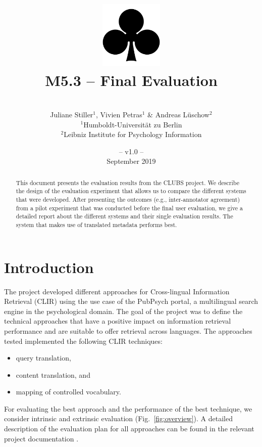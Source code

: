 \documentclass[a4paper,11pt]{article}
\title{
\includegraphics[width=3cm]{./img/200px-SuitClubs.png} \\
\Huge M5.3 -- Final Evaluation
  \\ 
}
\author{\vspace*{1cm}\\ \LARGE Juliane Stiller$^1$, Vivien Petras$^1$ \& Andreas Lüschow$^2$ \medskip \\ \Large $^1$Humboldt-Universit\"at zu Berlin\\\Large $^2$Leibniz Institute for Psychology Information}
\date{\vspace*{2cm} -- v1.0 --\\September 2019}
\begin{document}
\clearpage\maketitle
\thispagestyle{empty}

\vspace*{5cm}
\begin{abstract}
This document presents the evaluation results from the CLUBS project. We describe the design of the evaluation experiment that allows us to compare the different systems that were developed. After presenting the outcomes (e.g., inter-annotator agreement) from a pilot experiment that was conducted before the final user evaluation, we give a detailed report about the different systems and their single evaluation results. The system that makes use of translated metadata performs best.
\end{abstract}

\newpage
\tableofcontents
\clearpage


\section{Introduction}
The project developed different approaches for Cross-lingual Information Retrieval (CLIR) using the use case of the PubPsych portal, a multilingual search engine in the psychological domain. The goal of the project was to define the technical approaches that have a positive impact on information retrieval performance and are suitable to offer retrieval across languages. The approaches tested implemented the following CLIR techniques:
\begin{itemize}
    \item query translation,
    \item content translation, and
    \item mapping of controlled vocabulary.
\end{itemize}
For evaluating the best approach and the performance of the best technique, we consider intrinsic and extrinsic evaluation (Fig.~\ref{fig:overview}). A detailed description of the evaluation plan for all approaches can be found in the relevant project documentation \cite{m1.3.1_2017}. 
\end{document}
